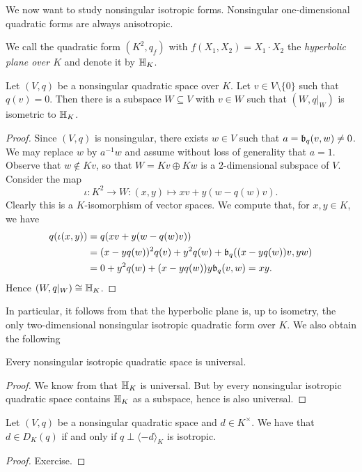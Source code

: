 \documentclass[12pt, leqno, british]{amsart}
\begin{document}
We now want to study nonsingular isotropic forms.
Nonsingular one-dimensional quadratic forms are always anisotropic.
\begin{defi}
We call the quadratic form $(K^2, q_f)$ with $f(X_1, X_2) = X_1 \cdot X_2$ the \emph{hyperbolic plane over $K$} and denote it by $\mathbb{H}_K$.
\end{defi}
\begin{prop}\label{P:hyperbolic-plane}
Let $(V, q)$ be a nonsingular quadratic space over $K$.
Let $v \in V \setminus \lbrace 0 \rbrace$ such that $q(v) = 0$.
Then there is a subspace $W \subseteq V$ with $v \in W$ such that $(W, q\vert_W)$ is isometric to $\mathbb{H}_K$.
\end{prop}
\begin{proof}
Since $(V, q)$ is nonsingular, there exists $w \in V$ such that $a = \mathfrak{b}_q(v, w) \neq 0$.
We may replace $w$ by $a^{-1}w$ and assume without loss of generality that $a = 1$.
Observe that $w \not\in Kv$, so that $W = Kv \oplus Kw$ is a $2$-dimensional subspace of $V$.
Consider the map
$$ \iota : K^2 \to W : (x, y) \mapsto xv + y(w - q(w)v).$$
Clearly this is a $K$-isomorphism of vector spaces.
We compute that, for $x, y \in K$, we have
\begin{align*}
q(\iota(x, y)) &= q(xv + y(w - q(w)v)) \\
&= (x-yq(w))^2 q(v) + y^2q(w) + \mathfrak{b}_q((x - yq(w))v, yw) \\
&= 0 + y^2q(w) + (x - yq(w))y\mathfrak{b}_q(v, w) = xy.
\end{align*}
Hence $(W, q\vert_W) \cong \mathbb{H}_K$.
\end{proof}
In particular, it follows from  that the hyperbolic plane is, up to isometry, the only two-dimensional nonsingular isotropic quadratic form over $K$.
We also obtain the following
\begin{cor}\label{C:isotropic->universal}
Every nonsingular isotropic quadratic space is universal.
\end{cor}
\begin{proof}
We know from  that $\mathbb{H}_K$ is universal.
But by  every nonsingular isotropic quadratic space contains $\mathbb{H}_K$ as a subspace, hence is also universal.
\end{proof}
\begin{cor}\label{C:representation-theorem}
Let $(V, q)$ be a nonsingular quadratic space and $d \in K^\times$.
We have that $d \in D_K(q)$ if and only if $q \perp \langle -d \rangle_K$ is isotropic.
\end{cor}
\begin{proof}
Exercise.
\end{proof}
\end{document}
